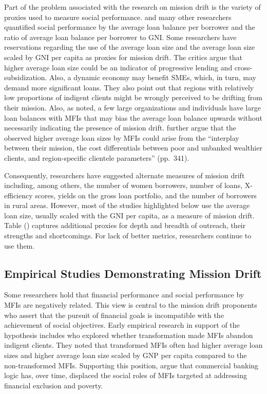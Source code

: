 \documentclass[a4paper, nobind]{templates/ociamthesis}
\begin{document}
Part of the problem associated with the research on mission drift is the variety of proxies used to measure social performance. \textcite{mersland2010microfinance} and many other researchers quantified social performance by the average loan balance per borrower and the ratio of average loan balance per borrower to GNI. Some researchers have reservations regarding the use of the average loan size and the average loan size scaled by GNI per capita as proxies for mission drift. The critics argue that higher average loan size could be an indicator of progressive lending and cross-subsidization. Also, a dynamic economy may benefit SMEs, which, in turn, may demand more significant loans. They also point out that regions with relatively low proportions of indigent clients might be wrongly perceived to be drifting from their mission. Also, as noted, a few large organizations and individuals have large loan balances with MFIs that may bias the average loan balance upwards without necessarily indicating the presence of mission drift. \autocite{armendariz2011mission} further argue that the observed higher average loan sizes by MFIs could arise from the ``interplay between their mission, the cost differentials between poor and unbanked wealthier clients, and region-specific clientele parameters'' (pp.~341).

Consequently, researchers have suggested alternate measures of mission drift including, among others, the number of women borrowers, number of loans, X-efficiency scores, yields on the gross loan portfolio, and the number of borrowers in rural areas. However, most of the studies highlighted below use the average loan size, usually scaled with the GNI per capita, as a measure of mission drift. Table () captures additional proxies for depth and breadth of outreach, their strengths and shortcomings. For lack of better metrics, researchers continue to use them.

\hypertarget{empirical-studies-demonstrating-mission-drift}{%
\subsection{Empirical Studies Demonstrating Mission Drift}\label{empirical-studies-demonstrating-mission-drift}}

\noindent Some researchers hold that financial performance and social performance by MFIs are negatively related. This view is central to the mission drift proponents who assert that the pursuit of financial goals is incompatible with the achievement of social objectives. Early empirical research in support of the hypothesis includes \textcite{christen2001commercialization} who explored whether transformation made MFIs abandon indigent clients. They noted that transformed MFIs often had higher average loan sizes and higher average loan size scaled by GNP per capita compared to the non-transformed MFIs. Supporting this position, \textcite{kent2013bankers} argue that commercial banking logic has, over time, displaced the social roles of MFIs targeted at addressing financial exclusion and poverty.
\end{document}
